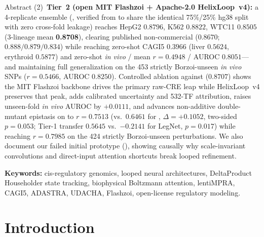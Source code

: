 \documentclass[10.5pt,a4paper]{article}
\begin{document}
\begin{abstractbox}{Abstract}
(2)~\textbf{Tier~2 (open MIT Flashzoi + Apache-2.0 HelixLoop~v4):} a 4-replicate ensemble (, verified from  to share the identical 75\%/25\% hg38 split with zero cross-fold leakage) reaches HepG2 $0.8796$, K562 $0.8822$, WTC11 $0.8505$ (3-lineage mean \textbf{0.8708}), clearing published non-commercial  ($0.8670$; $0.888/0.879/0.834$) while reaching zero-shot CAGI5 $0.3966$ (liver $0.5624$, erythroid $0.5877$) and zero-shot \emph{in vivo} / mean $r=0.4948$ / AUROC $0.8051$---and maintaining full generalization on the 453 strictly Borzoi-unseen  \emph{in vivo} SNPs ($r=0.5466$, AUROC $0.8250$). Controlled ablation against  ($0.8707$) shows the MIT Flashzoi backbone drives the primary raw-CRE leap while HelixLoop~v4 preserves that peak, adds calibrated uncertainty and 532-TF attribution, raises unseen-fold \emph{in vivo} AUROC by $+0.0111$, and advances non-additive double-mutant epistasis on  to $r=0.7513$ (vs.\ $0.6461$ for , $\Delta=+0.1052$, two-sided $p=0.053$; Tier-1 transfer $0.5645$ vs.\ $-0.2141$ for LegNet, $p=0.017$) while reaching $r=0.7985$ on the 424 strictly Borzoi-unseen   perturbations. We also document our failed initial prototype (), showing causally why scale-invariant convolutions and direct-input attention shortcuts break looped refinement.

\smallskip\noindent\textbf{Keywords:} cis-regulatory genomics, looped neural architectures, DeltaProduct Householder state tracking, biophysical Boltzmann attention, lentiMPRA, CAGI5, ADASTRA, UDACHA, Flashzoi, open-license regulatory modeling.
\end{abstractbox}

\section{Introduction}
\end{document}
